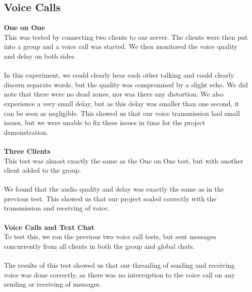 \documentclass[13pt]{article}
\begin{document}
\subsection{Voice Calls}

\textbf{One on One}\\
This was tested by connecting two clients to our server. The clients were then put into a group and a voice call was started. We then monitored the voice quality and delay on both sides.
\\\\
In this experiment, we could clearly hear each other talking and could clearly discern separate words, but the quality was compromised by a slight echo. We did note that there were no dead zones, nor was there any distortion. We also experience a very small delay, but as this delay was smaller than one second, it can be seen as negligible. This showed us that our voice transmission had  small issues, but we were unable to fix these issues in time for the project demonstration.
\\\\
\textbf{Three Clients}\\
This test was almost exactly the same as the One on One test, but with another client added to the group.
\\\\
We found that the audio quality and delay was exactly the same as in the previous test. This showed us that our project scaled correctly with the transmission and receiving of voice.
\\\\
\textbf{Voice Calls and Text Chat}\\
To test this, we ran the previous two voice call tests, but sent messages concurrently from all clients in both the group and global chats.
\\\\
The results of this test showed us that our threading of sending and receiving voice was done correctly, as there was no interruption to the voice call on any sending or receiving of messages.
\end{document}

